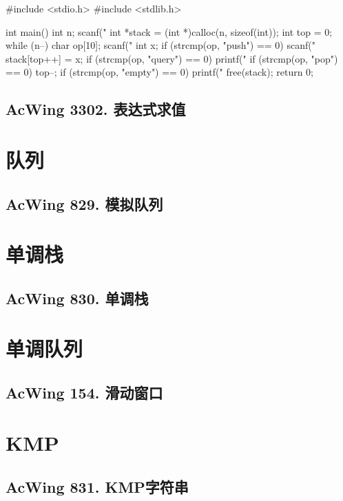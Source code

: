 \begin{mycpptwocol}[模拟栈]
#include <stdio.h>
#include <stdlib.h>

int main()
{
    int n;
    scanf("%
    int *stack = (int *)calloc(n, sizeof(int));
    int top = 0;
    while (n--) {
        char op[10];
        scanf("%
        int x;
        if (strcmp(op, "push") == 0) {
            scanf("%
            stack[top++] = x;
        }
        if (strcmp(op, "query") == 0) {
            printf("%
        }
        if (strcmp(op, "pop") == 0) {
            top--;
        }
        if (strcmp(op, "empty") == 0) {
            printf("%
        }
    }
    free(stack);
    return 0;
}
\end{mycpptwocol}
\subsection{AcWing 3302. 表达式求值}

\section{队列}
\subsection{AcWing 829. 模拟队列}

\section{单调栈}

\subsection{AcWing 830. 单调栈}

\section{单调队列}
\subsection{AcWing 154. 滑动窗口}

\section{KMP}
\subsection{AcWing 831. KMP字符串}

